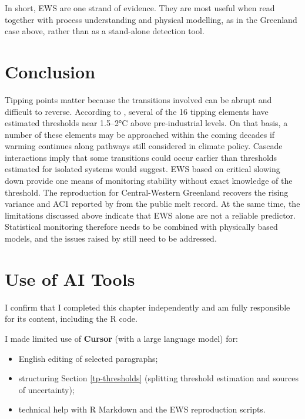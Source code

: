 \documentclass[
]{krantz}
\providecommand{\tightlist}{%
  \setlength{\itemsep}{0pt}\setlength{\parskip}{0pt}}
\begin{document}
In short, EWS are one strand of evidence. They are most useful when read
together with process understanding and physical modelling, as in the
Greenland case above, rather than as a stand-alone detection tool.

\section{Conclusion}\label{conclusion-6}

Tipping points matter because the transitions involved can be abrupt and
difficult to reverse. According to \citet{armstrongmckay2022}, several of the 16
tipping elements have estimated thresholds near 1.5--2°C above
pre-industrial levels. On that basis, a number of these elements may be
approached within the coming decades if warming continues along pathways
still considered in climate policy. Cascade interactions imply that some
transitions could occur earlier than thresholds estimated for isolated
systems would suggest. EWS based on critical slowing down provide one means
of monitoring stability without exact knowledge of the threshold. The
reproduction for Central-Western Greenland recovers the rising variance and
AC1 reported by \citet{boers2021} from the public melt record. At the same time,
the limitations discussed above indicate that EWS alone are not a reliable
predictor. Statistical monitoring therefore needs to be combined with
physically based models, and the issues raised by \citet{rietkerk2025} still need
to be addressed.

\section*{Use of AI Tools}\label{use-of-ai-tools}


I confirm that I completed this chapter independently and am fully
responsible for its content, including the R code.

I made limited use of \textbf{Cursor} (with a large language model) for:

\begin{itemize}
\tightlist
\item
  English editing of selected paragraphs;
\item
  structuring Section \ref{tp-thresholds} (splitting threshold estimation
  and sources of uncertainty);
\item
  technical help with R Markdown and the EWS reproduction scripts.
\end{itemize}
\end{document}
